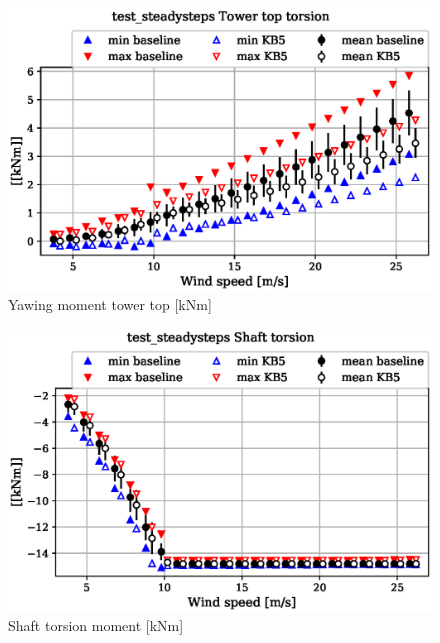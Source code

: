 \begin{figure}[!ht]
\begin{center}
	\includegraphics[width=.85\linewidth]{figures/baseline-vs-KB6/test_steadysteps/tower-tower-node-004-momentvec-z_AA0007_AA0003.eps}
\end{center}
\caption{Yawing moment tower top [kNm]}
\label{fig:baseline-vs-KB6:test_steadysteps:tower-top-yaw}
\end{figure}

\begin{figure}[!ht]
\begin{center}
	\includegraphics[width=.85\linewidth]{figures/baseline-vs-KB6/test_steadysteps/shaft-shaft-node-001-momentvec-z_AA0007_AA0003.eps}
\end{center}
\caption{Shaft torsion moment [kNm]}
\label{fig:baseline-vs-KB6:test_steadysteps:shaft-torsion}
\end{figure}

